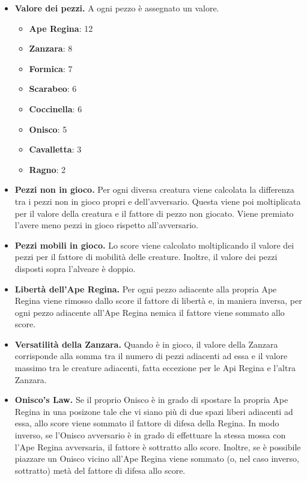 \documentclass[a4paper,12pt]{article}
\begin{document}
    \begin{itemize}
        \item \textbf{Valore dei pezzi.} A ogni pezzo è assegnato un valore.
        \begin{itemize}
            \item \textbf{Ape Regina}: 12
            \item \textbf{Zanzara}: 8
            \item \textbf{Formica}: 7
            \item \textbf{Scarabeo}: 6
            \item \textbf{Coccinella}: 6
            \item \textbf{Onisco}: 5
            \item \textbf{Cavalletta}: 3
            \item \textbf{Ragno}: 2
        \end{itemize}
        \item \textbf{Pezzi non in gioco.} Per ogni diversa creatura viene calcolata la differenza tra i pezzi non in gioco propri e dell'avversario. Questa viene poi moltiplicata per il valore della creatura e il fattore di pezzo non giocato. Viene premiato l'avere meno pezzi in gioco rispetto all'avversario.
        \item \textbf{Pezzi mobili in gioco.} Lo score viene calcolato moltiplicando il valore dei pezzi per il fattore di mobilità delle creature. Inoltre, il valore dei pezzi disposti sopra l'alveare è doppio.
        \item \textbf{Libertà dell'Ape Regina.} Per ogni pezzo adiacente alla propria Ape Regina viene rimosso dallo score il fattore di libertà e, in maniera inversa, per ogni pezzo adiacente all'Ape Regina nemica il fattore viene sommato allo score.
        \item \textbf{Versatilità della Zanzara.} Quando è in gioco, il valore della Zanzara corrisponde alla somma tra il numero di pezzi adiacenti ad essa e il valore massimo tra le creature adiacenti, fatta eccezione per le Api Regina e l'altra Zanzara.
        \item \textbf{Onisco's Law.} Se il proprio Onisco è in grado di spostare la propria Ape Regina in una posizone tale che vi siano più di due spazi liberi adiacenti ad essa, allo score viene sommato il fattore di difesa della Regina.
        In modo inverso, se l'Onisco avversario è in grado di effettuare la stessa mossa con l'Ape Regina avversaria, il fattore è sottratto allo score.
        Inoltre, se è possibile piazzare un Onisco vicino all'Ape Regina viene sommato (o, nel caso inverso, sottratto) metà del fattore di difesa allo score.

    \end{itemize}
\end{document}
